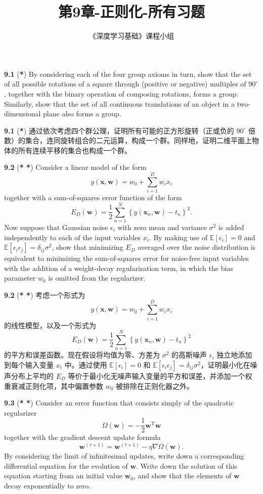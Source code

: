 \documentclass{article}
\title{第9章-正则化-所有习题}
\author{《深度学习基础》课程小组}
\begin{document}
\maketitle

\textbf{9.1} (\textbf{*}) By considering each of the four group axioms in turn, show that the set of all possible rotations of a square through (positive or negative) multiples of $90^\circ$, together with the binary operation of composing rotations, forms a group. Similarly, show that the set of all continuous translations of an object in a two-dimensional plane also forms a group.

\textbf{9.1} (\textbf{*}) 通过依次考虑四个群公理，证明所有可能的正方形旋转（正或负的 $90^\circ$ 倍数）的集合，连同旋转组合的二元运算，构成一个群。同样地，证明二维平面上物体的所有连续平移的集合也构成一个群。

\textbf{9.2} (\textbf{* *}) Consider a linear model of the form
\[
y(\mathbf{x}, \mathbf{w}) = w_0 + \sum_{i=1}^{D} w_i x_i
\]
together with a sum-of-squares error function of the form
\[
E_D(\mathbf{w}) = \frac{1}{2} \sum_{n=1}^{N} \left\{ y(\mathbf{x}_n, \mathbf{w}) - t_n \right\}^2.
\]
Now suppose that Gaussian noise $\epsilon_i$ with zero mean and variance $\sigma^2$ is added independently to each of the input variables $x_i$. By making use of $\mathbb{E}[\epsilon_i] = 0$ and $\mathbb{E}[\epsilon_i \epsilon_j] = \delta_{ij} \sigma^2$, show that minimizing $E_D$ averaged over the noise distribution is equivalent to minimizing the sum-of-squares error for noise-free input variables with the addition of a weight-decay regularization term, in which the bias parameter $w_0$ is omitted from the regularizer.

\textbf{9.2} (\textbf{* *}) 考虑一个形式为
\[
y(\mathbf{x}, \mathbf{w}) = w_0 + \sum_{i=1}^{D} w_i x_i
\]
的线性模型，以及一个形式为
\[
E_D(\mathbf{w}) = \frac{1}{2} \sum_{n=1}^{N} \left\{ y(\mathbf{x}_n, \mathbf{w}) - t_n \right\}^2
\]
的平方和误差函数。现在假设将均值为零、方差为 $\sigma^2$ 的高斯噪声 $\epsilon_i$ 独立地添加到每个输入变量 $x_i$ 中。通过使用 $\mathbb{E}[\epsilon_i] = 0$ 和 $\mathbb{E}[\epsilon_i \epsilon_j] = \delta_{ij} \sigma^2$，证明最小化在噪声分布上平均的 $E_D$ 等价于最小化无噪声输入变量的平方和误差，并添加一个权重衰减正则化项，其中偏置参数 $w_0$ 被排除在正则化器之外。

\textbf{9.3} (\textbf{* *}) Consider an error function that consists simply of the quadratic regularizer
\[
\Omega(\mathbf{w}) = -\frac{1}{2} \mathbf{w}^\mathrm{T} \mathbf{w}
\]
together with the gradient descent update formula
\[
\mathbf{w}^{(\tau+1)} = \mathbf{w}^{(\tau+1)} - \eta \nabla \Omega(\mathbf{w}).
\]
By considering the limit of infinitesimal updates, write down a corresponding differential equation for the evolution of $\mathbf{w}$. Write down the solution of this equation starting from an initial value $\mathbf{w}_0$, and show that the elements of $\mathbf{w}$ decay exponentially to zero.
\end{document}
